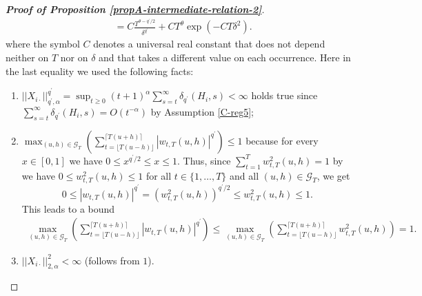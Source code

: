 \documentclass[a4paper,12pt]{article}
\makeatletter
\renewcommand{\eqref}[1]{\tagform@{\ref{#1}}}
\makeatother
\begin{document}
\begin{proof}[\textnormal{\textbf{Proof of Proposition \ref{propA-intermediate-relation-2}}}]
\begin{align*}
&= C \frac{ T^{\theta - q^\prime/2}}{\delta^{q^\prime}} + C T^\theta \exp \left(-C T \delta^2\right).
\end{align*}
where the symbol $C$ denotes a universal real constant that does not depend neither on $T$ nor on $\delta$ and that takes a different value on each occurrence. Here in the last equality we used the following facts:
\begin{enumerate}
	\item $||X_{i\cdot}||^{q^\prime}_{q^\prime, \alpha} = \sup_{t\geq 0} (t+1)^{\alpha} \sum_{s=t}^{\infty} \delta_{q^\prime}(H_{i}, s)  < \infty$ holds true since $\sum_{s=t}^{\infty}\delta_{q^\prime}(H_{i}, s) = O(t^{-\alpha})$ by Assumption \ref{C-reg5};
	\item $\max_{(u, h) \in \mathcal{G}_T} \left( \sum_{t=\lfloor T(u-h) \rfloor}^{\lceil T(u+h) \rceil} |w_{t,T}(u,h)|^{q^\prime}\right) \leq 1$ because for every $x \in [0, 1]$ we have $ 0 \leq x^{q^\prime/2} \leq x \leq 1$. Thus, since $\sum_{t=1}^{T} w^2_{t,T}(u,h) = 1$ by \eqref{sum-weights} we have \linebreak $0 \leq w^2_{t,T}(u,h) \leq 1$ for all $t\in \{1, \ldots, T\}$ and all $(u, h) \in \mathcal{G}_T$, we get
$$ 0 \leq |w_{t,T}(u,h)|^{q^\prime} =  (w^2_{t,T}(u,h))^{q^\prime/2} \leq w^2_{t,T}(u,h) \leq 1.$$
This leads to a bound  
\begin{align*}
\max_{(u, h) \in \mathcal{G}_T} \left( \sum_{t=\lfloor T(u-h) \rfloor}^{\lceil T(u+h) \rceil} |w_{t,T}(u,h)|^{q^\prime}\right) \leq
\max_{(u, h) \in \mathcal{G}_T} \left( \sum_{t=\lfloor T(u-h) \rfloor}^{\lceil T(u+h) \rceil} w_{t,T}^2(u,h)\right) =1.
\end{align*}
	\item $||X_{i\cdot}||^{2}_{2, \alpha} < \infty$ (follows from $1$).
\end{enumerate}



\end{proof}
\end{document}
